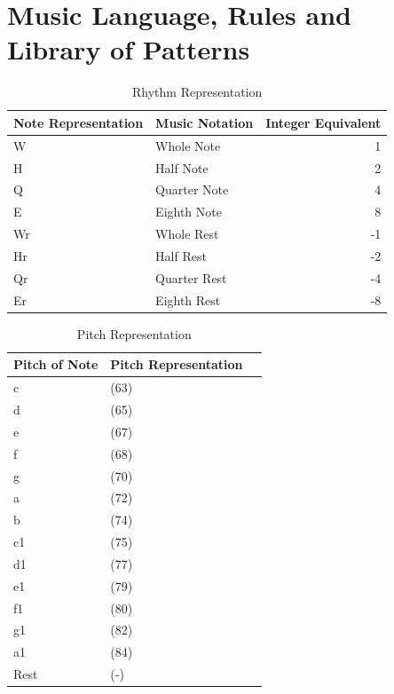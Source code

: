 \section{Music Language, Rules and Library of Patterns}

\begin{table}[H]
\caption{Rhythm Representation}
\label{musiclang}
\centering
\begin{tabular}{|l|l|r|} 
\hline
Note Representation & Music Notation & Integer Equivalent  \\ 
\hline
W                   & Whole Note     & 1                   \\ 
\hline
H                   & Half Note      & 2                   \\ 
\hline
Q                   & Quarter Note   & 4                   \\ 
\hline
E                   & Eighth Note    & 8                   \\ 
\hline
Wr                  & Whole Rest     & -1                  \\ 
\hline
Hr                  & Half Rest      & -2                  \\ 
\hline
Qr                  & Quarter Rest   & -4                  \\ 
\hline
Er                  & Eighth Rest    & -8                  \\
\hline
\end{tabular}
\end{table}

\begin{table}[H]
\caption{Pitch Representation}
\label{pitchVal}
\centering
\begin{tabular}{|l|l|r|} 
\hline
Pitch of Note & Pitch Representation   \\ 
\hline
c                   & (63)                     \\ 
\hline
d                   & (65)                      \\ 
\hline
e                   & (67)                      \\ 
\hline
f                   & (68)                    \\ 
\hline
g                   & (70)                      \\ 
\hline
a                   & (72)                       \\ 
\hline
b                   & (74)                    \\ 
\hline
c1                   & (75)                    \\ 
\hline
d1                   & (77)                    \\ 
\hline
e1                   & (79)                    \\ 
\hline
f1                   & (80)                    \\ 
\hline
g1                   & (82)                    \\ 
\hline
a1                   & (84)                    \\ 
\hline
Rest                   & (-)                    \\ 
\hline
\end{tabular}
\end{table}

